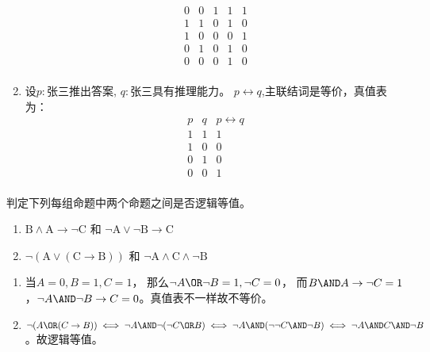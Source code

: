\documentclass{ctexart}
\begin{document}
\begin{solution}
\begin{enumerate}
\[\begin{matrix}
          0 & 0 & 1 & 1       & 1               \\
          1 & 1 & 0 & 1       & 0               \\
          1 & 0 & 0 & 0       & 1               \\
          0 & 1 & 0 & 1       & 0               \\
          0 & 0 & 0 & 1       & 0               \\
        \end{matrix}
      \]
    \item 设\(p:\text{张三推出答案}\), \(q:\text{张三具有推理能力}\)。
      \(p \leftrightarrow q\),主联结词是等价，真值表为：
      \[
        \begin{matrix}
          p & q & p \leftrightarrow q \\
          1 & 1 & 1                   \\
          1 & 0 & 0                   \\
          0 & 1 & 0                   \\
          0 & 0 & 1                   \\
        \end{matrix}
      \]
  \end{enumerate}

\end{solution}

\begin{problem}\label{pro:7}

  判定下列每组命题中两个命题之间是否逻辑等值。
  \begin{enumerate}
    \item $\mathrm{B} \wedge \mathrm{A} \rightarrow \neg \mathrm{C}$ 和 $\neg \mathrm{A} \vee \neg \mathrm{B} \rightarrow \mathrm{C}$
    \item $\neg(\mathrm{A} \vee(\mathrm{C} \rightarrow \mathrm{B}))$ 和 $\neg \mathrm{A} \wedge \mathrm{C} \wedge \neg \mathrm{B}$
  \end{enumerate}

\end{problem}

\begin{solution}
  \begin{enumerate}
    \item 当\(A = 0, B=1,C=1\)， 那么\(\neg A \OR \neg B = 1, \neg C=0\)， 而\(B \AND A \to \neg C = 1\)，\(\neg A \AND \neg B \to C = 0\)。真值表不一样故不等价。
    \item \(\neg(A \OR(C \to B)) \iff \neg A \AND \neg (\neg C \OR B) \iff \neg A \AND (\neg \neg C \AND \neg B )\iff \neg A \AND C \AND \neg B\)。故逻辑等值。
  \end{enumerate}

\end{solution}
\end{document}
